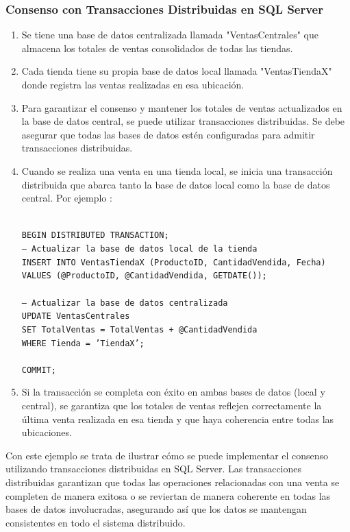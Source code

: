\subsubsection{Consenso con Transacciones Distribuidas en SQL Server}
\noindent
\begin{enumerate}
	\item Se tiene una base de datos centralizada llamada "VentasCentrales" que almacena los totales de ventas consolidados de todas las tiendas.
	\item Cada tienda tiene su propia base de datos local llamada "VentasTiendaX" donde registra las ventas realizadas en esa ubicación.
	\item Para garantizar el consenso y mantener los totales de ventas actualizados en la base de datos central, se puede utilizar transacciones distribuidas. Se debe asegurar que todas las bases de datos estén configuradas para admitir transacciones distribuidas.
	\item Cuando se realiza una venta en una tienda local, se inicia una transacción distribuida que abarca tanto la base de datos local como la base de datos central. Por ejemplo \label{eje:consenso}:
	
	\texttt{\\BEGIN DISTRIBUTED TRANSACTION;\\
		-- Actualizar la base de datos local de la tienda\\
		INSERT INTO VentasTiendaX (ProductoID, CantidadVendida, Fecha)\\
		VALUES (@ProductoID, @CantidadVendida, GETDATE());\\ \\
		-- Actualizar la base de datos centralizada\\
		UPDATE VentasCentrales\\
		SET TotalVentas = TotalVentas + @CantidadVendida\\
		WHERE Tienda = 'TiendaX';\\ \\
		COMMIT;\\
	}
	\item Si la transacción se completa con éxito en ambas bases de datos (local y central), se garantiza que los totales de ventas reflejen correctamente la última venta realizada en esa tienda y que haya coherencia entre todas las ubicaciones.
\end{enumerate}
Con este ejemplo se trata de ilustrar cómo se puede implementar el consenso utilizando transacciones distribuidas en SQL Server. Las transacciones distribuidas garantizan que todas las operaciones relacionadas con una venta se completen de manera exitosa o se reviertan de manera coherente en todas las bases de datos involucradas, asegurando así que los datos se mantengan consistentes en todo el sistema distribuido.

